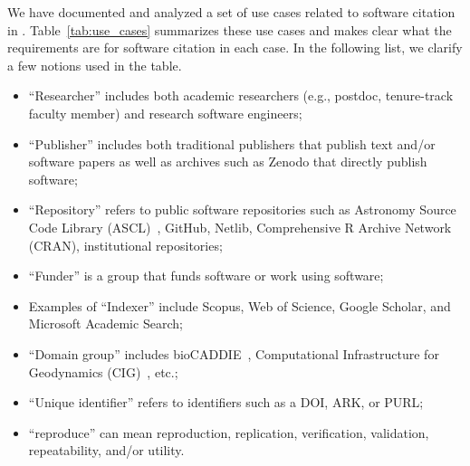 \documentclass[11pt, oneside]{amsart}
\begin{document}
We have documented and analyzed a set of use cases related to software citation
in \cite{SC-Use-Cases}. Table~\ref{tab:use_cases} summarizes these use cases and
makes clear what the requirements are for software citation in each case. In the following list,
we clarify a few notions used in the table.
\begin{itemize}

\item ``Researcher'' includes both academic researchers (e.g., postdoc,
tenure-track faculty member) and research software engineers;

\item ``Publisher'' includes both traditional publishers that publish text
and\slash or software papers as well as archives such as Zenodo that directly
publish software;

\item ``Repository'' refers to public software repositories such as Astronomy
Source Code Library (ASCL)~\cite{ascl}, GitHub, Netlib, Comprehensive R Archive
Network (CRAN), institutional repositories;

\item ``Funder'' is a group that funds software or work using software; 

\item Examples of ``Indexer'' include Scopus, Web of Science, Google Scholar,
and Microsoft Academic Search;

\item ``Domain group'' includes bioCADDIE~\cite{bioCADDIE}, Computational
Infrastructure for Geodynamics (CIG)~\cite{CIG}, etc.;

\item ``Unique identifier'' refers to identifiers such as a DOI, ARK, or PURL;

\item``reproduce'' can mean reproduction, replication, verification, validation,
repeatability, and\slash or utility.
\end{itemize}
\end{document}
